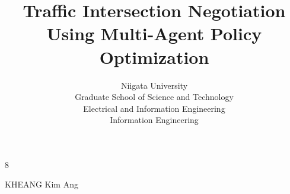 



\begin{toppage}
  \title{Traffic Intersection Negotiation Using Multi-Agent Policy Optimization}{8}

  \author{Niigata University\\Graduate School of Science and Technology\\Electrical and Information Engineering\\Information Engineering }{KHEANG Kim Ang}
\end{toppage}



\contents
\listoffigures
\listoftables







% 


%



